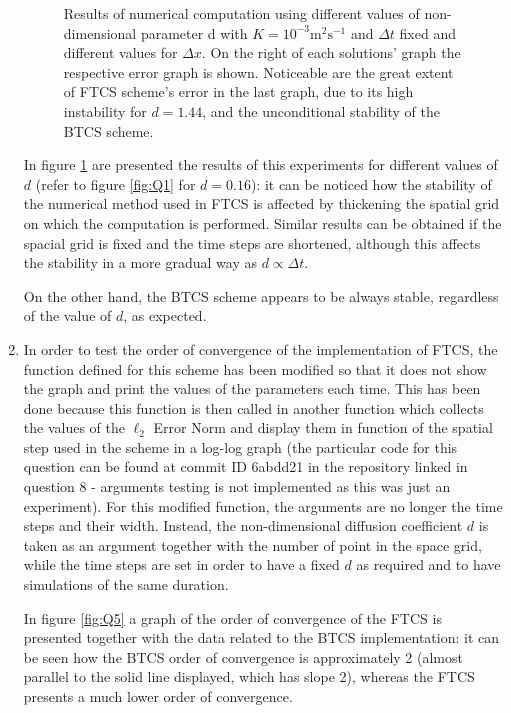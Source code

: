 \documentclass[12pt]{article}
\begin{document}
\begin{enumerate}
\begin{figure}[!tbh]
\caption{Results of numerical computation using different values of non-dimensional parameter d with $K=10^{-3}\text{m}^{2}\text{s}^{-1}$ and $\Delta t$ fixed and different values for $\Delta x$. On the right of each solutions' graph the respective error graph is shown. Noticeable are the great extent of FTCS scheme's error in the last graph, due to its high instability for $d=1.44$, and the unconditional stability of the BTCS scheme.
\label{fig:Q4}}
\end{figure}

In figure \ref{fig:Q4} are presented the results of this experiments for different values of $d$ (refer to figure \ref{fig:Q1} for $d=0.16$): it can be noticed how the stability of the numerical method used in FTCS is affected by thickening the spatial grid on which the computation is performed. Similar results can be obtained if the spacial grid is fixed and the time steps are shortened, although this affects the stability in a more gradual way as $d\propto \Delta t$. \par
On the other hand, the BTCS scheme appears to be always stable, regardless of the value of $d$, as expected.

\item In order to test the order of convergence of the implementation of FTCS, the function defined for this scheme has been modified so that it does not show the graph and print the values of the parameters each time. This has been done because this function is then called in another function which collects the values of the $\ell_2$ Error Norm and display them in function of the spatial step used in the scheme in a log-log graph (the particular code for this question can be found at commit ID 6abdd21 in the repository linked in question 8 - arguments testing is not implemented as this was just an experiment).
For this modified function, the arguments are no longer the time steps and their width. Instead, the non-dimensional diffusion coefficient $d$ is taken as an argument together with the number of point in the space grid, while the time steps are set in order to have a fixed $d$ as required and to have simulations of the same duration.\par
In figure \ref{fig:Q5} a graph of the order of convergence of the FTCS is presented together with the data related to the BTCS implementation: it can be seen how the BTCS order of convergence is approximately 2 (almost parallel to the solid line displayed, which has slope 2), whereas the FTCS presents a much lower order of convergence.


\end{enumerate}
\end{document}

